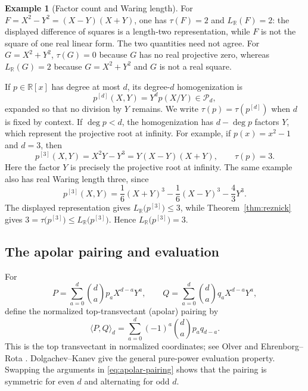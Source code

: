 \documentclass[11pt,letterpaper,reqno]{amsart}
\numberwithin{equation}{section}
\theoremstyle{definition}
\newtheorem{example}[theorem]{Example}
\newcommand{\RR}{\mathbb{R}}
\newcommand{\cP}{\mathcal{P}}
\newcommand{\LR}{L_{\RR}}
\begin{document}
\begin{example}[Factor count and Waring length]\label{ex:tau-length}
For \(F=X^2-Y^2=(X-Y)(X+Y)\), one has \(\tau(F)=2\) and
\(\LR(F)=2\): the displayed difference of squares is a length-two
representation, while \(F\) is not the square of one real linear form.
The two quantities need not agree.  For \(G=X^2+Y^2\),
\(\tau(G)=0\) because \(G\) has no real projective zero, whereas
\(\LR(G)=2\) because \(G=X^2+Y^2\) and \(G\) is not a real square.
\end{example}

If \(p\in\RR[x]\) has degree at most \(d\), its degree-\(d\)
homogenization is
\begin{equation}\label{eq:homogenization}
 p^{[d]}(X,Y)=Y^dp(X/Y)\in\cP_d,
\end{equation}
expanded so that no division by \(Y\) remains.  We write
\(\tau(p)=\tau(p^{[d]})\) when \(d\) is fixed by context.  If
\(\deg p<d\), the homogenization has \(d-\deg p\) factors \(Y\), which
represent the projective root at infinity.
For example, if \(p(x)=x^2-1\) and \(d=3\), then
\[
 p^{[3]}(X,Y)=X^2Y-Y^3=Y(X-Y)(X+Y),
 \qquad \tau(p)=3.
\]
Here the factor \(Y\) is precisely the projective root at infinity.
The same example also has real Waring length three, since
\[
 p^{[3]}(X,Y)=\frac16(X+Y)^3-\frac16(X-Y)^3-\frac43Y^3.
\]
The displayed representation gives
\(\LR\bigl(p^{[3]}\bigr)\le3\), while
Theorem~\ref{thm:reznick} gives
\(3=\tau\bigl(p^{[3]}\bigr)\le\LR\bigl(p^{[3]}\bigr)\).  Hence
\(\LR\bigl(p^{[3]}\bigr)=3\).

\subsection{The apolar pairing and evaluation}

For
\[
 P=\sum_{a=0}^d\binom da p_aX^{d-a}Y^a,
 \qquad
 Q=\sum_{a=0}^d\binom da q_aX^{d-a}Y^a,
\]
define the normalized top-transvectant (apolar) pairing by
\begin{equation}\label{eq:apolar-pairing}
 \langle P,Q\rangle_d
 =\sum_{a=0}^d(-1)^a\binom da p_aq_{d-a}.
\end{equation}
This is the top transvectant in normalized coordinates; see Olver
\cite[Chapter~5]{Olver1999} and Ehrenborg--Rota
\cite{EhrenborgRota1993}.  Dolgachev--Kanev
\cite[Lemma~1.6]{DolgachevKanev1993} give the general pure-power
evaluation property.  Swapping the arguments in
\eqref{eq:apolar-pairing} shows that the pairing is symmetric for even
\(d\) and alternating for odd \(d\).
\end{document}
